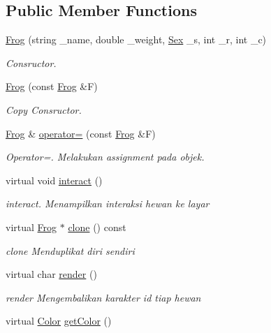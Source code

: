 \subsection*{Public Member Functions}
\begin{DoxyCompactItemize}
\item 
\hyperlink{classFrog_a9d2d178018dce67508988cfbee10a45b}{Frog} (string \+\_\+name, double \+\_\+weight, \hyperlink{sex_8h_a2633cb393c68bb2ee8080db58fb7ba93}{Sex} \+\_\+s, int \+\_\+r, int \+\_\+c)
\begin{DoxyCompactList}\small\item\em Consructor. \end{DoxyCompactList}\item 
\hyperlink{classFrog_ad799dd037bbf07877f47f512478f5971}{Frog} (const \hyperlink{classFrog}{Frog} \&F)
\begin{DoxyCompactList}\small\item\em Copy Consructor. \end{DoxyCompactList}\item 
\hyperlink{classFrog}{Frog} \& \hyperlink{classFrog_a6ae0b058647cf4fe8565f27029d1d02a}{operator=} (const \hyperlink{classFrog}{Frog} \&F)
\begin{DoxyCompactList}\small\item\em Operator=. Melakukan assignment pada objek. \end{DoxyCompactList}\item 
virtual void \hyperlink{classFrog_a1f48dff9c7eb100579f938c53c9fa25b}{interact} ()
\begin{DoxyCompactList}\small\item\em interact. Menampilkan interaksi hewan ke layar \end{DoxyCompactList}\item 
virtual \hyperlink{classFrog}{Frog} $\ast$ \hyperlink{classFrog_aab84684c4f6729ab89b1dd7470471d06}{clone} () const 
\begin{DoxyCompactList}\small\item\em clone Menduplikat diri sendiri \end{DoxyCompactList}\item 
virtual char \hyperlink{classFrog_a000e111ff655934cde3f06132841e736}{render} ()
\begin{DoxyCompactList}\small\item\em render Mengembalikan karakter id tiap hewan \end{DoxyCompactList}\item 
virtual \hyperlink{color_8h_ab87bacfdad76e61b9412d7124be44c1c}{Color} \hyperlink{classFrog_a6c7683144ff8beae2b66905178f74ed4}{get\+Color} ()

\end{DoxyCompactItemize}
